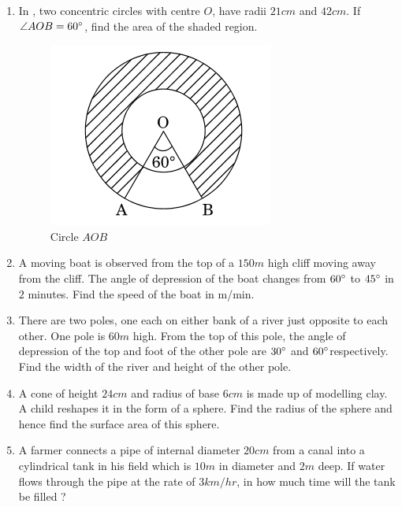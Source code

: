 \begin{enumerate}
\item In , two concentric circles with centre $O$, have radii $21 cm$ and $42 cm$. If $\angle AOB = 60\degree$, find the area of the shaded region.
\begin{figure}[H]
    \centering
    \includegraphics[width=\columnwidth]{figs/geo.png}
    \caption{Circle $AOB$ }
    \label{fig:Fig_1}
\end{figure}

\item A moving boat is observed from the top of a $150m$ high cliff moving away from the cliff. The angle of depression of the boat changes from $60\degree$ to $45\degree$ in $2$ minutes. Find the speed of the boat in m/min.

\item There are two poles, one each on either bank of a river just opposite to each other. One pole is $60m$ high. From the top of this pole, the angle of depression of the top and foot of the other pole are $30\degree$ and $60\degree$respectively. Find the width of the river and height of the other pole.

\item A cone of height $24 cm$ and radius of base $6 cm$ is made up of modelling clay. A child reshapes it in the form of a sphere. Find the radius of the sphere and hence find the surface area of this sphere.

\item A farmer connects a pipe of internal diameter $20 cm$ from a canal into a cylindrical tank in his field which is $10 m$ in diameter and $2 m$ deep. If water flows through the pipe at the rate of $3 km/hr$, in how much time will the tank be filled ?


\end{enumerate}
